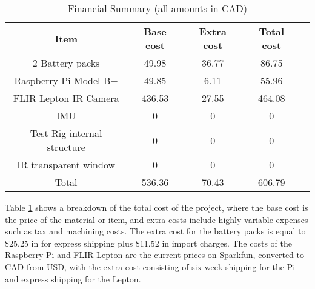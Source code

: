 
\begin{table}
\caption{\label{tab:financialsummary}Financial Summary (all amounts in CAD)}
\begin{tabular}{c|c|c|c|c}
\textbf{Item} & \textbf{Base cost} & \textbf{Extra cost} & \textbf{Total cost}\\
2 Battery packs & 49.98 & 36.77 & 86.75\\
Raspberry Pi Model B+ & 49.85 & 6.11 & 55.96\\
FLIR Lepton IR Camera & 436.53 & 27.55 & 464.08\\
IMU & 0 & 0 & 0\\
Test Rig internal structure & 0 & 0 & 0\\
IR transparent window & 0 & 0 & 0\\
Total & 536.36 & 70.43 & 606.79\\

\end{tabular}
\end{table}

Table \ref{tab:financialsummary} shows a breakdown of the total cost of the project, where the base cost is the price of the material or item, and extra costs include highly variable expenses such as tax and machining costs. The extra cost for the battery packs is equal to \$25.25 in for express shipping plus \$11.52 in import charges. The costs of the Raspberry Pi and FLIR Lepton are the current prices on Sparkfun, converted to CAD from USD, with the extra cost consisting of six-week shipping for the Pi and express shipping for the Lepton.
